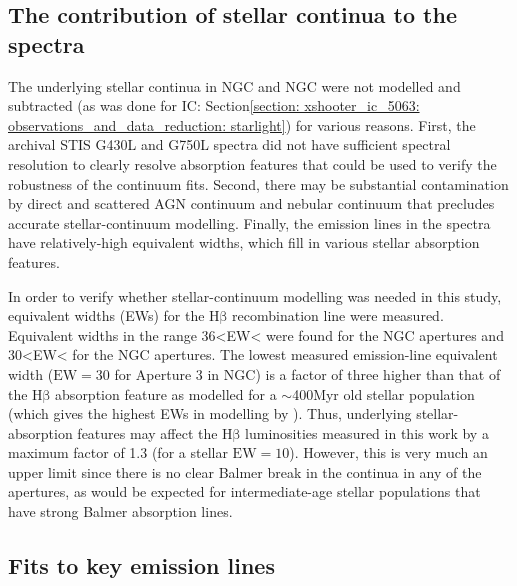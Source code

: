 \subsection{The contribution of stellar continua to the spectra}
\label{section: stis_seyferts: stellar_continua}

The underlying stellar continua in NGC and NGC were not modelled and subtracted (as was done for IC: Section\;\ref{section: xshooter_ic_5063: observations_and_data_reduction: starlight}) for various reasons. First, the archival STIS G430L and G750L spectra did not have sufficient spectral resolution to clearly resolve absorption features that could be used to verify the robustness of the continuum fits. Second, there may be substantial contamination by direct and scattered AGN continuum \citep{Antonucci1985} and nebular continuum \citep{Tadhunter2016} that precludes accurate stellar-continuum modelling. Finally, the emission lines in the spectra have relatively-high equivalent widths, which fill in various stellar absorption features.

In order to verify whether stellar-continuum modelling was needed in this study, equivalent widths (EWs) for the H$\mathrm{\beta}$ recombination line were measured. Equivalent widths in the range \mbox{36\;\textless\;EW\;\textless{}\;{\AA}} were found for the NGC apertures and \mbox{30\;\textless\;EW\;\textless{}\;{\AA}} for the NGC apertures. The lowest measured emission-line equivalent width ($\mathrm{EW}=30$\;{\AA} for Aperture 3 in NGC) is a factor of three higher than that of the H$\mathrm{\beta}$ absorption feature as modelled for a $\sim$400\;Myr old stellar population (which gives the highest EWs in modelling by \citealt{GonzalezDelgado1999}). Thus, underlying stellar-absorption features may affect the H$\mathrm{\beta}$ luminosities measured in this work by a maximum factor of 1.3 (for a stellar $\mathrm{EW}=10$\;{\AA}). However, this is very much an upper limit since there is no clear Balmer break in the continua in any of the apertures, as would be expected for intermediate-age stellar populations that have strong Balmer absorption lines.

\subsection{Fits to key emission lines}
\label{section: stis_seyferts: oiii_models}

